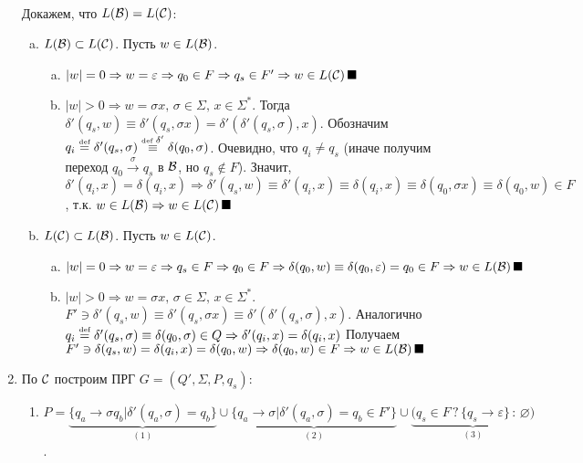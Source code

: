 \documentclass[a4paper]{article}
\def\B{{\cal B}}
\def\C{{\cal C}}
\def\eqdef{\overset{\mbox{\tiny def}}{=}}
\begin{document}
\begin{enumerate}
\begin{tabular}{|c|c|c|}
\begin{minipage}{0.35\textwidth}
\begin{tikzpicture}[shorten >=1pt,node distance=2cm,on grid,auto,initial text=]
\end{tikzpicture}
\end{minipage}\\
\hline
\end{tabular}
\\[5pt]
Докажем, что $L(\B)=L(\C)$:
\begin{enumerate}[a.]
\item $L(\B)\subset L(\C)$. Пусть $w\in L(\B)$.\begin{enumerate}[a.]
\item $|w|=0\Rightarrow w=\varepsilon\Rightarrow q_0\in F\Rightarrow q_s\in F'\Rightarrow w\in L(\C)\,\blacksquare$
\item $|w|>0\Rightarrow w=\sigma x,\,\sigma\in\Sigma,\,x\in\Sigma^*$. Тогда $\delta'(q_s,w)\equiv\delta'(q_s,\sigma x)=\delta'(\delta'(q_s,\sigma),x)$. Обозначим $q_i\eqdef \delta'(q_s,\sigma)\overset{\mbox{\tiny def } \delta'}{\equiv}\delta(q_0,\sigma)$.\newline
Очевидно, что $q_i\neq q_s$ (иначе получим переход $q_0\overset{\sigma}{\longrightarrow}q_s$ в $\B$, но $q_s\notin F$). Значит, $\delta'(q_i,x)=\delta(q_i,x)\Rightarrow\delta'(q_s,w)\equiv\delta'(q_i,x)\equiv\delta(q_i,x)\equiv\delta(q_0,\sigma x)\equiv\delta(q_0,w)\in F$, т.к. $w\in L(\B)\Rightarrow w\in L(\C)\,\blacksquare$
\end{enumerate}
\item $L(\C)\subset L(\B)$. Пусть $w\in L(\C)$.\begin{enumerate}[a.]
\item $|w|=0\Rightarrow w=\varepsilon\Rightarrow q_s\in F\Rightarrow q_0\in F\Rightarrow\delta(q_0,w)\equiv\delta(q_0,\varepsilon)=q_0\in F\Rightarrow w\in L(\B)\,\blacksquare$
\item $|w|>0\Rightarrow w=\sigma x,\,\sigma\in\Sigma,\,x\in\Sigma^*$. $F'\ni\delta'(q_s,w)\equiv\delta'(q_s,\sigma x)\equiv\delta'(\delta'(q_s,\sigma),x)$. Аналогично $q_i\eqdef \delta'(q_s,\sigma)\equiv\delta(q_0,\sigma)\in Q\Rightarrow \delta'(q_i,x)=\delta(q_i,x)$\newline
Получаем $F'\ni\delta(q_s,w)=\delta(q_i,x)=\delta(q_0,w)\Rightarrow\delta(q_0,w)\in F\Rightarrow w\in L(\B)\,\blacksquare$
\end{enumerate}
\end{enumerate}
\item По $\C$ построим ПРГ $G=(Q',\Sigma,P,q_s)$:\begin{enumerate}[1.]
\item $P=\underbrace{\{q_a\longrightarrow\sigma q_b\big|\delta'(q_a,\sigma)=q_b\}}_{(1)}\cup\underbrace{\{q_a\longrightarrow\sigma\big|\delta'(q_a,\sigma)=q_b\in F'\}}_{(2)}\cup\underbrace{\big(q_s\in F\,?\,\{q_s\longrightarrow\varepsilon\}\,:\,\varnothing\big)}_{(3)}$.\newline

\end{enumerate}
\end{enumerate}
\end{document}
